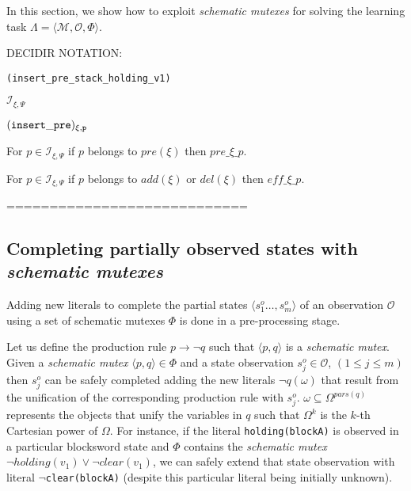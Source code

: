 \documentclass{article}
\newcommand{\tup}[1]{{\langle #1 \rangle}}
\begin{document}
In this section, we show how to exploit \emph{schematic mutexes} for solving the learning task $\Lambda=\tup{\mathcal{M},{\mathcal O},\Phi}$.


DECIDIR NOTATION:

{\tt{\small (insert\_pre\_stack\_holding\_v1)}}

$\mathcal{I}_{\xi,\Psi}$

${\tt{\small (insert\_pre)_{\xi,p}}}$

For $p \in \mathcal{I}_{\xi,\Psi}$ if $p$ belongs to $pre(\xi)$ then  $pre\_\xi\_p$.


For $p \in \mathcal{I}_{\xi,\Psi}$ if $p$ belongs to $add(\xi)$  or $del(\xi)$ then $eff\_\xi\_p$.


============================


\subsection{Completing partially observed states with {\em schematic mutexes}}

Adding new literals to complete the partial states $\tup{s_1^o \ldots, s_m^o}$ of an observation $\mathcal{O}$  using a set of schematic mutexes $\Phi$ is done in a pre-processing stage.

Let us define the production rule $p\rightarrow\neg q$ such that $\tup{p,q}$ is a {\em schematic mutex}. Given a {\em schematic mutex} $\tup{p,q}\in \Phi$ and a state observation $s_j^o\in \mathcal{O}$, {\small $(1\leq j\leq m)$} then $s_j^o$ can be safely completed adding the new literals $\neg q(\omega)$ that result from the unification of the corresponding production rule with $s_j^o$. $\omega\subseteq\Omega^{pars(q)}$ represents the objects that unify the variables in $q$ such that $\Omega^k$ is the $k$-th Cartesian power of $\Omega$. For instance, if the literal {\tt\small holding(blockA)} is observed in a particular blocksword state and $\Phi$ contains the {\em schematic mutex} $\neg holding(v_1)\vee\neg clear(v_1)$, we can safely extend that state observation with literal {\tt\small $\neg$clear(blockA)} (despite this particular literal being initially unknown).
\end{document}
